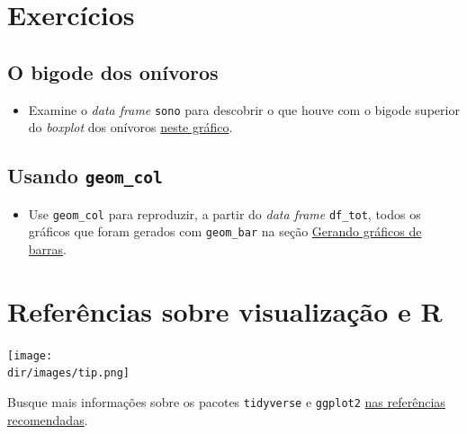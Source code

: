 \documentclass[
  11pt]{report}
\providecommand{\tightlist}{%
  \setlength{\itemsep}{0pt}\setlength{\parskip}{0pt}}
\newcommand{\dir}{/ssd/R/x86_64-pc-linux-gnu-library/4.1/fnaufelRmd/rmarkdown/resources}
\newenvironment{rmdtip}
{
  \begin{mytip}
    \texttt{[image: \\dir/images/tip.png]}
    \tcblower
  }
  {
  \end{mytip}
}
\begin{document}
\hypertarget{exercuxedcios-6}{%
\section{Exercícios}\label{exercuxedcios-6}}

\hypertarget{o-bigode-dos-onuxedvoros}{%
\subsection{O bigode dos onívoros}\label{o-bigode-dos-onuxedvoros}}

\begin{itemize}
\tightlist
\item
  Examine o \emph{data frame} \texttt{sono} para descobrir o que houve com o bigode superior do \emph{boxplot} dos onívoros \protect\hyperlink{onivoros}{neste gráfico}.
\end{itemize}

\hypertarget{usando-geom_col}{%
\subsection{\texorpdfstring{Usando \texttt{geom\_col}}{Usando geom\_col}}\label{usando-geom_col}}

\begin{itemize}
\tightlist
\item
  Use \texttt{geom\_col} para reproduzir, a partir do \emph{data frame} \texttt{df\_tot}, todos os gráficos que foram gerados com \texttt{geom\_bar} na seção \protect\hyperlink{gerando-grux5cux25C3ux5cux25A1ficos-de-barras}{Gerando gráficos de barras}.
\end{itemize}

\hypertarget{section}{%
\subsection{}\label{section}}

\hypertarget{referuxeancias-sobre-visualizauxe7uxe3o-e-r}{%
\section{Referências sobre visualização e R}\label{referuxeancias-sobre-visualizauxe7uxe3o-e-r}}

\begin{rmdtip}
Busque mais informações sobre os pacotes \texttt{tidyverse} e \texttt{ggplot2} \protect\hyperlink{refrec}{nas referências recomendadas}.

\end{rmdtip}
\end{document}
